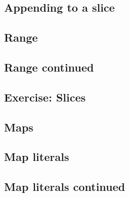 \subsection{Appending to a slice}




\subsection{Range}




\subsection{Range continued}




\subsection{Exercise: Slices}

% 
% 

\subsection{Maps}




\subsection{Map literals}




\subsection{Map literals continued}





